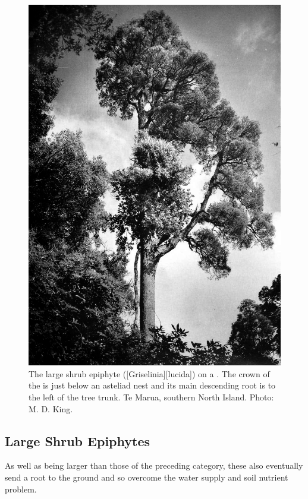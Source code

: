 \begin{figure}[!t]
\begin{minipage}[t]{\textwidth}
\begin{minipage}[t]{(\textwidth-\fgap) * \real{0.503}}
			\centering
			\includegraphics[width=\textwidth]{graphics/figure45puka.jpg}
			\caption[The large shrub epiphyte puka]{The large shrub epiphyte  ([Griselinia][lucida]) on a .
			The crown of the  is just below an asteliad nest and its main descending root is to the left of the tree trunk.
			Te Marua, southern North Island.
			Photo: M. D. King.}%
			\label{fig:45puka}
		\end{minipage}
	\end{minipage}
\end{figure}

\subsection{Large Shrub Epiphytes}

As well as being larger than those of the preceding category, these also eventually send a root to the ground and so overcome the water supply and soil nutrient problem.

